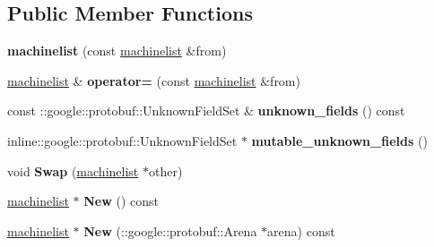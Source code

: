 \subsection*{Public Member Functions}
\begin{DoxyCompactItemize}
\item 
{\bfseries machinelist} (const \hyperlink{classmachines_1_1machinelist}{machinelist} \&from)\hypertarget{classmachines_1_1machinelist_aeb77751467dab731912ff100d2e8ff8f}{}\label{classmachines_1_1machinelist_aeb77751467dab731912ff100d2e8ff8f}

\item 
\hyperlink{classmachines_1_1machinelist}{machinelist} \& {\bfseries operator=} (const \hyperlink{classmachines_1_1machinelist}{machinelist} \&from)\hypertarget{classmachines_1_1machinelist_a425169f4038ffa9f436a99d131ef65fb}{}\label{classmachines_1_1machinelist_a425169f4038ffa9f436a99d131ef65fb}

\item 
const \+::google\+::protobuf\+::\+Unknown\+Field\+Set \& {\bfseries unknown\+\_\+fields} () const \hypertarget{classmachines_1_1machinelist_a61f5604abcfb838ef755c27de2235a80}{}\label{classmachines_1_1machinelist_a61f5604abcfb838ef755c27de2235a80}

\item 
inline\+::google\+::protobuf\+::\+Unknown\+Field\+Set $\ast$ {\bfseries mutable\+\_\+unknown\+\_\+fields} ()\hypertarget{classmachines_1_1machinelist_a9b509425f813d9287194f5e218a653a3}{}\label{classmachines_1_1machinelist_a9b509425f813d9287194f5e218a653a3}

\item 
void {\bfseries Swap} (\hyperlink{classmachines_1_1machinelist}{machinelist} $\ast$other)\hypertarget{classmachines_1_1machinelist_a18768daa99eec22cc9d0289cc796091f}{}\label{classmachines_1_1machinelist_a18768daa99eec22cc9d0289cc796091f}

\item 
\hyperlink{classmachines_1_1machinelist}{machinelist} $\ast$ {\bfseries New} () const \hypertarget{classmachines_1_1machinelist_a7fed1795d25c11f71312461ada39eaee}{}\label{classmachines_1_1machinelist_a7fed1795d25c11f71312461ada39eaee}

\item 
\hyperlink{classmachines_1_1machinelist}{machinelist} $\ast$ {\bfseries New} (\+::google\+::protobuf\+::\+Arena $\ast$arena) const \hypertarget{classmachines_1_1machinelist_a316522d7c5152bb4564c027dc0fdbe8a}{}\label{classmachines_1_1machinelist_a316522d7c5152bb4564c027dc0fdbe8a}


\end{DoxyCompactItemize}
